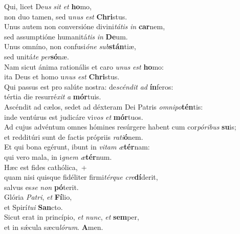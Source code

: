 \evenverse Qui, licet De\textit{us} \textit{sit} \textit{et} \textbf{ho}mo,~\*\\
\evenverse non duo tamen, sed u\textit{nus} \textit{est} \textbf{Chri}stus.\\
\oddverse Unus autem non conversióne divini\textit{tá}\textit{tis} \textit{in} \textbf{car}nem,~\*\\
\oddverse sed assumptióne humanitá\textit{tis} \textit{in} \textbf{De}um.\\
\evenverse Unus omníno, non confusi\textit{ó}\textit{ne} \textit{sub}\textbf{stán}tiæ,~\*\\
\evenverse sed unitá\textit{te} \textit{per}\textbf{só}næ.\\
\oddverse Nam sicut ánima rationális et caro \textit{u}\textit{nus} \textit{est} \textbf{ho}mo:~\*\\
\oddverse ita Deus et homo u\textit{nus} \textit{est} \textbf{Chri}stus.\\
\evenverse Qui passus est pro salúte nostra: de\textit{scén}\textit{dit} \textit{ad} \textbf{ín}feros:~\*\\
\evenverse tértia die resurré\textit{xit} \textit{a} \textbf{mór}tuis.\\
\oddverse Ascéndit ad cælos, sedet ad déxteram Dei Patris \textit{om}\textit{ni}\textit{po}\textbf{tén}tis:~\*\\
\oddverse inde ventúrus est judicáre vi\textit{vos} \textit{et} \textbf{mór}tuos.\\
\evenverse Ad cujus advéntum omnes hómines resúrgere habent cum cor\textit{pó}\textit{ri}\textit{bus} \textbf{su}is;~\*\\
\evenverse et redditúri sunt de factis própriis \textit{ra}\textit{ti}\textbf{ó}nem.\\
\oddverse Et qui bona egérunt, ibunt in \textit{vi}\textit{tam} \textit{æ}\textbf{tér}nam:~\*\\
\oddverse qui vero mala, in i\textit{gnem} \textit{æ}\textbf{tér}num.\\
\evenverse Hæc est fides cathólica,~+\\
\evenverse  quam nisi quisque fidéliter firmi\textit{tér}\textit{que} \textit{cre}\textbf{dí}derit,~\*\\
\evenverse salvus es\textit{se} \textit{non} \textbf{pó}terit.\\
\oddverse Glória \textit{Pa}\textit{tri}, \textit{et} \textbf{Fí}lio,~\*\\
\oddverse et Spirí\textit{tu}\textit{i} \textbf{San}cto.\\
\evenverse Sicut erat in princípio, \textit{et} \textit{nunc}, \textit{et} \textbf{sem}per,~\*\\
\evenverse et in sǽcula sæcu\textit{ló}\textit{rum}. \textbf{A}men.\\
